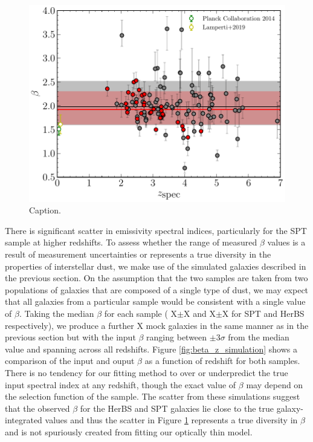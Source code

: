\begin{figure}
	\centering
	\includegraphics[width=0.75\columnwidth]{Figures/beta_evolution.pdf}
	\caption{Caption.}
	\label{fig:beta_z_evolution}
\end{figure}

There is significant scatter in emissivity spectral indices, particularly for the SPT sample at higher redshifts. To assess whether the range of measured $\beta$ values is a result of measurement uncertainties or represents a true diversity in the properties of interstellar dust, we make use of the simulated galaxies described in the previous section. On the assumption that the two samples are taken from two populations of galaxies that are composed of a single type of dust, we may expect that all galaxies from a particular sample would be consistent with a single value of $\beta$. Taking the median $\beta$ for each sample ({\color{red} X$\pm$X} and {\color{red} X$\pm$X} for SPT and HerBS respectively), we produce a further {\color{red} X} mock galaxies in the same manner as in the previous section but with the input $\beta$ ranging between $\pm 3\sigma$ from the median value and spanning across all redshifts. Figure \ref{fig:beta_z_simulation} shows a comparison of the input and ouput $\beta$ as a function of redshift for both samples. There is no tendency for our fitting method to over or underpredict the true input spectral index at any redshift, though the exact value of $\beta$ may depend on the selection function of the sample. The scatter from these simulations suggest that the observed $\beta$ for the HerBS and SPT galaxies lie close to the true galaxy-integrated values and thus the scatter in Figure \ref{fig:beta_z_evolution} represents a true diversity in $\beta$ and is not spuriously created from fitting our optically thin model.


